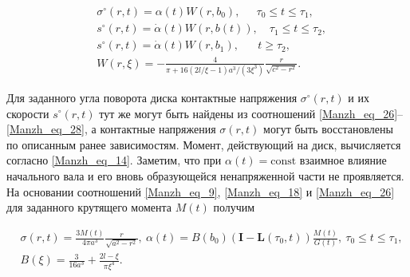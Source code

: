 \begin{align}

  &\label{Manzh_eq_26}%

  \sigma^\circ(r,t)=\alpha(t)W(r,b_0),\quad \ \! \

  \tau_0\leq t\leq\tau_1,

\\

  &\label{Manzh_eq_27}%

  s^\circ(r,t)=\dot\alpha(t)W(r,b(t)),\quad

  \tau_1\leq t\leq\tau_2,

\\

  &\label{Manzh_eq_28}%

  s^\circ(r,t)=\dot\alpha(t)W(r,b_1),\quad \ \ \   t\geq\tau_2,

\\

  &\nonumber

  W(r,\xi)=-\frac4{\pi+16(2l/\xi-1)a^3\!/(3\xi^3)}  \frac r{\sqrt{c^2-r^2}}.

\end{align}



Для заданного угла поворота диска контактные напряжения $\sigma^\circ(r,t)$ и их скорости $s^\circ(r,t)$ тут же могут быть найдены из соотношений \eqref{Manzh_eq_26}--\eqref{Manzh_eq_28}, а контактные напряжения $\sigma(r,t)$ могут быть восстановлены по описанным ранее зависимостям. Момент, действующий на диск, вычисляется согласно \eqref{Manzh_eq_14}. Заметим, что при $\alpha(t)=\mathrm{const}$ взаимное влияние начального вала и его вновь образующейся ненапряженной части не проявляется. На основании соотношений \eqref{Manzh_eq_9}, \eqref{Manzh_eq_18} и \eqref{Manzh_eq_26} для заданного крутящего момента $M(t)$ получим

\begin{align}

  &

  \label{Manzh_eq_29}%

  \sigma(r,t)=\frac{3M(t)}{4\pi a^3}\frac r{\sqrt{a^2-r^2}},

\ 

  \alpha(t)=B(b_0)(\mathbf I-\mathbf L(\tau_0,t))\frac{M(t)}{G(t)},\ 

  \tau_0\leq t\leq\tau_1, 

\\

  &

  B(\xi)=\frac3{16a^3}+\frac{2l-\xi}{\pi\xi^4}.

\end{align}



